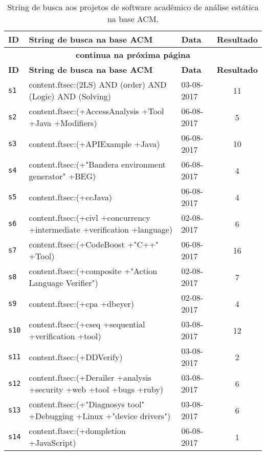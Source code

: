 \begin{longtable}{| l | p{13cm} | l | c |}
  \caption{String de busca aos projetos de software acadêmico de análise estática na base ACM.}
  \label{search-strings-table-acm} \\
  \hline
  \endfirsthead
  \hline
  \textbf{ID} & \textbf{String de busca na base ACM} & \textbf{Data} & \textbf{Resultado} \\
  \hline
  \endhead
  \multicolumn{4}{c}{\textbf{continua na próxima página}} \\
  \hhline{----} \endfoot
  \endlastfoot
  \textbf{ID} & \textbf{String de busca na base ACM} & \textbf{Data} & \textbf{Resultado} \\
  \hline
\texttt{s1} & content.ftsec:(2LS) AND (order) AND (Logic) AND (Solving) & 03-08-2017 & 11 \\
    \hline
\texttt{s2} & content.ftsec:(+AccessAnalysis +Tool +Java +Modifiers) & 06-08-2017 & 5 \\
    \hline
\texttt{s3} & content.ftsec:(+APIExample +Java) & 06-08-2017 & 10 \\
    \hline
\texttt{s4} & content.ftsec:(+"Bandera environment generator" +BEG) & 06-08-2017 & 4 \\
    \hline
\texttt{s5} & content.ftsec:(+ccJava) & 06-08-2017 & 4 \\
    \hline
\texttt{s6} & content.ftsec:(+civl +concurrency +intermediate +verification +language) & 02-08-2017 & 6 \\
    \hline
\texttt{s7} & content.ftsec:(+CodeBoost +"C++" +Tool) & 06-08-2017 & 16 \\
    \hline
\texttt{s8} & content.ftsec:(+composite +"Action Language Verifier") & 02-08-2017 & 7 \\
    \hline
\texttt{s9} & content.ftsec:(+cpa +dbeyer) & 02-08-2017 & 4 \\
    \hline
\texttt{s10} & content.ftsec:(+cseq +sequential +verification +tool) & 03-08-2017 & 12 \\
    \hline
\texttt{s11} & content.ftsec:(+DDVerify) & 03-08-2017 & 2 \\
    \hline
\texttt{s12} & content.ftsec:(+Derailer +analysis +security +web +tool +bugs +ruby) & 03-08-2017 & 6 \\
    \hline
\texttt{s13} & content.ftsec:(+"Diagnosys tool" +Debugging +Linux +"device drivers") & 03-08-2017 & 6 \\
    \hline
\texttt{s14} & content.ftsec:(+dompletion +JavaScript) & 06-08-2017 & 1 \\
    \hline

\end{longtable}
